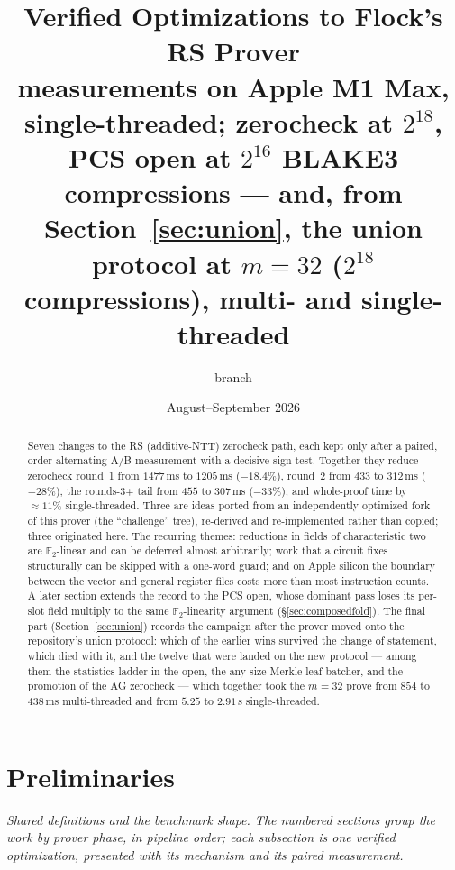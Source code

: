 \documentclass[11pt]{article}
\title{Verified Optimizations to Flock's RS Prover\\
{\large measurements on Apple M1 Max, single-threaded; zerocheck at $2^{18}$,
PCS open at $2^{16}$ BLAKE3 compressions --- and, from
Section~\ref{sec:union}, the union protocol at $m{=}32$ ($2^{18}$
compressions), multi- and single-threaded}}
\author{branch \code{snark-fast-improvements}}
\date{August--September 2026}
\newcommand{\Ftwo}{\mathbb{F}_2}
\begin{document}
\maketitle

\begin{abstract}
Seven changes to the RS (additive-NTT) zerocheck path, each kept only after a
paired, order-alternating A/B measurement with a decisive sign test. Together
they reduce zerocheck round~1 from $1477\,$ms to $1205\,$ms ($-18.4\%$),
round~2 from $433$ to $312\,$ms ($-28\%$), the rounds-3+ tail from $455$ to
$307\,$ms ($-33\%$), and whole-proof time by $\approx11\%$
single-threaded. Three are ideas ported
from an independently optimized fork of this prover (the ``challenge'' tree),
re-derived and re-implemented rather than copied; three originated here. The
recurring themes: reductions in fields of characteristic two are
$\Ftwo$-linear and can be deferred almost arbitrarily; work that a circuit
fixes structurally can be skipped with a one-word guard; and on Apple silicon
the boundary between the vector and general register files costs more than
most instruction counts. A later section extends the record to the PCS open,
whose dominant pass loses its per-slot field multiply to the same
$\Ftwo$-linearity argument (\S\ref{sec:composedfold}). The final part
(Section~\ref{sec:union}) records the campaign after the prover moved
onto the repository's union protocol: which of the earlier wins
survived the change of statement, which died with it, and the twelve
that were landed on the new protocol --- among them the statistics
ladder in the open, the any-size Merkle leaf batcher, and the
promotion of the AG zerocheck --- which together took the $m{=}32$
prove from $854$ to $438$\,ms multi-threaded and from $5.25$ to
$2.91$\,s single-threaded.
\end{abstract}

\section*{Preliminaries}

\emph{Shared definitions and the benchmark shape. The numbered sections
group the work by prover phase, in pipeline order; each \emph{subsection}
is one verified optimization, presented with its mechanism and its paired
measurement.}
\end{document}
